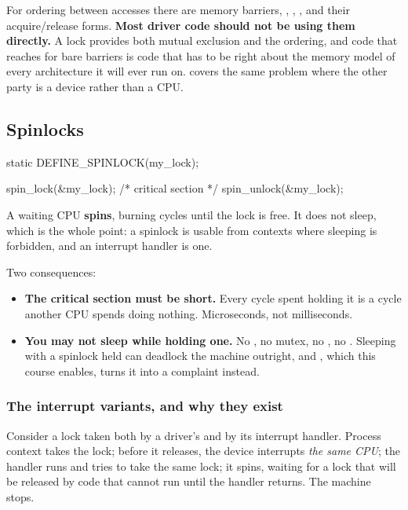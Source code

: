 For ordering between accesses there are memory barriers, , ,
, and their acquire/release forms. \textbf{Most driver code should not be using them
directly.} A lock provides both mutual exclusion and the ordering, and code that reaches for bare
barriers is code that has to be right about the memory model of every architecture it will ever run
on.  covers the same problem where the other party is a device rather than a
CPU.

\subsection{Spinlocks}
\label{c7:app:a5}

\begin{ccode}
static DEFINE_SPINLOCK(my_lock);

spin_lock(&my_lock);
/* critical section */
spin_unlock(&my_lock);
\end{ccode}

\noindent A waiting CPU \textbf{spins}, burning cycles until the lock is free. It does not sleep,
which is the whole point: a spinlock is usable from contexts where sleeping is forbidden, and an
interrupt handler is one.

Two consequences:
\begin{itemize}
  \item \textbf{The critical section must be short.} Every cycle spent holding it is a cycle another
    CPU spends doing nothing. Microseconds, not milliseconds.
  \item \textbf{You may not sleep while holding one.} No , no mutex, no
    , no . Sleeping with a spinlock held can deadlock the machine
    outright, and , which this course enables, turns it into a
    complaint instead.
\end{itemize}

\subsubsection{The interrupt variants, and why they exist}
\label{c7:app:a:the-interrupt-variants-and-why-they-exist}

Consider a lock taken both by a driver's  and by its interrupt handler. Process context
takes the lock; before it releases, the device interrupts \emph{the same CPU}; the handler runs and
tries to take the same lock; it spins, waiting for a lock that will be released by code that cannot
run until the handler returns. The machine stops.

